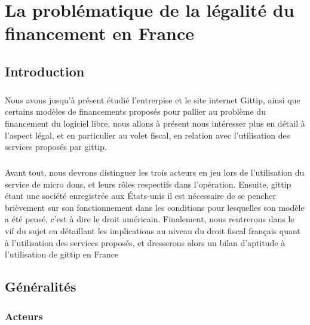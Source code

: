 \chapter{La problématique de la légalité du financement en France}\label{chapter3}
    \section{Introduction}
        \paragraph{}
            Nous avons jusqu'à présent étudié l'entrerpise et le site
            internet Gittip, ainsi que certains modèles de financements
            proposés pour pallier au problème du financement du logiciel
            libre, nous allons à présent nous intéresser plus en détail
            à l'aspect légal, et en particulier au volet fiscal, en relation
            avec l'utilisation des services proposés par gittip.
        \paragraph{}
            Avant tout, nous devrons distinguer les trois acteurs en jeu
            lors de l'utilisation du service de micro dons, et leurs rôles
            respectifs dans l'opération. 
            Ensuite, gittip étant une société enregistrée aux États-unis
            il est nécessaire de se pencher brièvement sur son fonctionnement
            dans les conditions pour lesquelles son modèle a été pensé,
            c'est à dire le droit américain.
            Finalement, nous rentrerons dans le vif du sujet en détaillant les
            implications au niveau du droit fiscal français quant à
            l'utilisation des services proposés, et dresserons alors un bilan
            d'aptitude à l'utilisation de gittip en France

    \section{Généralités}
        \subsection{Acteurs}
